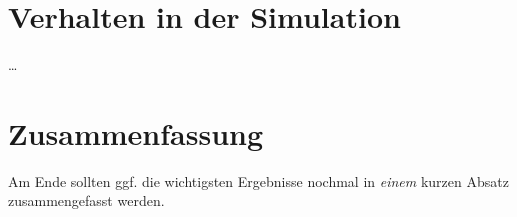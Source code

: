 \section{Verhalten in der Simulation}
\label{ch:Evaluierung:sec:Simulation}

\ldots

\section{Zusammenfassung}
\label{ch:Evaluierung:sec:zusammenfassung}

Am Ende sollten ggf. die wichtigsten Ergebnisse nochmal in \emph{einem} kurzen Absatz zusammengefasst werden.

